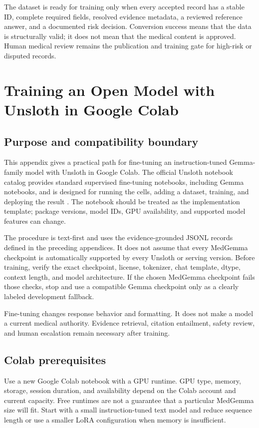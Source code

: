 \documentclass[11pt,oneside]{book}
\begin{document}
The dataset is ready for training only when every accepted record has a stable ID, complete required fields, resolved evidence metadata, a reviewed reference answer, and a documented risk decision. Conversion success means that the data is structurally valid; it does not mean that the medical content is approved. Human medical review remains the publication and training gate for high-risk or disputed records.

\chapter{Training an Open Model with Unsloth in Google Colab}

\section{Purpose and compatibility boundary}

This appendix gives a practical path for fine-tuning an instruction-tuned Gemma-family model with Unsloth in Google Colab. The official Unsloth notebook catalog provides standard supervised fine-tuning notebooks, including Gemma notebooks, and is designed for running the cells, adding a dataset, training, and deploying the result \cite{ref215}. The notebook should be treated as the implementation template; package versions, model IDs, GPU availability, and supported model features can change.

The procedure is text-first and uses the evidence-grounded JSONL records defined in the preceding appendices. It does not assume that every MedGemma checkpoint is automatically supported by every Unsloth or serving version. Before training, verify the exact checkpoint, license, tokenizer, chat template, dtype, context length, and model architecture. If the chosen MedGemma checkpoint fails those checks, stop and use a compatible Gemma checkpoint only as a clearly labeled development fallback.

Fine-tuning changes response behavior and formatting. It does not make a model a current medical authority. Evidence retrieval, citation entailment, safety review, and human escalation remain necessary after training.

\section{Colab prerequisites}

Use a new Google Colab notebook with a GPU runtime. GPU type, memory, storage, session duration, and availability depend on the Colab account and current capacity. Free runtimes are not a guarantee that a particular MedGemma size will fit. Start with a small instruction-tuned text model and reduce sequence length or use a smaller LoRA configuration when memory is insufficient.
\end{document}
